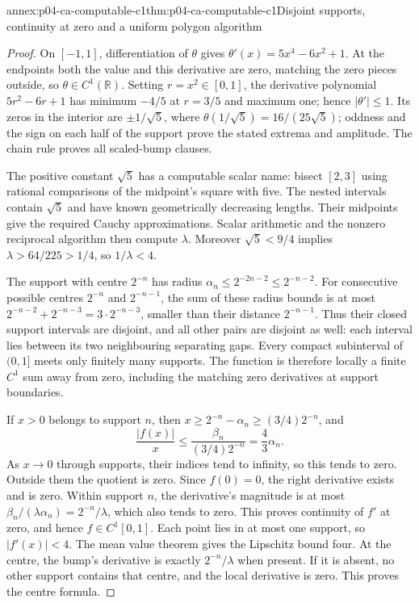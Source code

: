 \begin{annexitem}{annex:p04-ca-computable-c1}{thm:p04-ca-computable-c1}{Disjoint supports, continuity at zero and a uniform polygon algorithm}
\begin{proof}
On \([-1,1]\), differentiation of \(\theta\) gives
\(\theta'(x)=5x^4-6x^2+1\). At the endpoints both the value and
this derivative are zero, matching the zero pieces outside, so
\(\theta\in C^1(\mathbb R)\). Setting \(r=x^2\in[0,1]\),
the derivative polynomial \(5r^2-6r+1\) has minimum \(-4/5\)
at \(r=3/5\) and maximum one; hence \(|\theta'|\leq1\).
Its zeros in the interior are \(\pm1/\sqrt5\), where
\(\theta(1/\sqrt5)=16/(25\sqrt5)\); oddness and the sign on
each half of the support prove the stated extrema and amplitude.
The chain rule proves all scaled-bump clauses.

The positive constant \(\sqrt5\) has a computable scalar name:
bisect \([2,3]\) using rational comparisons of the midpoint's square
with five. The nested intervals contain \(\sqrt5\) and have known
geometrically decreasing lengths. Their midpoints give the required
Cauchy approximations. Scalar arithmetic and the nonzero reciprocal
algorithm then compute \(\lambda\). Moreover
\(\sqrt5<9/4\) implies \(\lambda>64/225>1/4\), so
\(1/\lambda<4\).

The support with centre \(2^{-n}\) has radius
\(\alpha_n\leq2^{-2n-2}\leq2^{-n-2}\).
For consecutive possible centres \(2^{-n}\) and \(2^{-n-1}\),
the sum of these radius bounds is at most
\(2^{-n-2}+2^{-n-3}=3\cdot2^{-n-3}\), smaller than their
distance \(2^{-n-1}\). Thus their closed support intervals
are disjoint, and all other pairs are disjoint as well: each interval
lies between its two neighbouring separating gaps. Every compact
subinterval of \((0,1]\) meets only finitely many supports.
The function is therefore locally a finite \(C^1\) sum away from zero,
including the matching zero derivatives at support boundaries.

If \(x>0\) belongs to support \(n\), then
\(x\geq2^{-n}-\alpha_n\geq(3/4)2^{-n}\), and
\[
 \frac{|f(x)|}{x}
 \leq \frac{\beta_n}{(3/4)2^{-n}}
 =\frac43\alpha_n.
\]
As \(x\to0\) through supports, their indices tend to infinity,
so this tends to zero. Outside them the quotient is zero.
Since \(f(0)=0\), the right derivative exists and is zero.
Within support \(n\), the derivative's magnitude is at most
\(\beta_n/(\lambda\alpha_n)=2^{-n}/\lambda\), which also
tends to zero. This proves continuity of \(f'\) at zero, and hence
\(f\in C^1[0,1]\).
Each point lies in at most one support, so \(|f'(x)|<4\).
The mean value theorem gives the Lipschitz bound four.
At the centre, the bump's derivative is exactly \(2^{-n}/\lambda\)
when present. If it is absent, no other support contains that centre,
and the local derivative is zero. This proves the centre formula.


\end{proof}
\end{annexitem}
